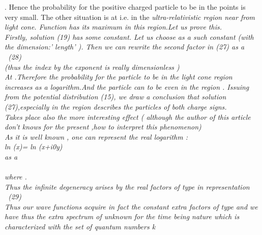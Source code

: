 \documentclass[a4paper,12pt] {article}
\begin{document}
{ \coordHE{}. Hence the  probability for the positive charged  particle to be in the points
 \coordHE{} is very small. The other situation is at \coordHE{} i.e. in the  \it ultra-relativistic region \rm
  near from light cone. Function  \coordHE{}  has its maximum in this region.Let us prove this.
\\ Firstly, solution  (19) has some constant. Let us choose as a such constant \coordHE{}
 (with the dimension:' length' \coordHE{} ). Then we can rewrite the second factor in  (27) as a \\\coordHE{}
\ (28)
\\(thus \it the index by the exponent is really dimensionless \rm )
\\  At \coordHE{}.Therefore the  probability for the particle to be in the light cone region
 increases as a \it logarithm.\rm And the particle can to be even in the region \coordHE{}. Issuing from
 the potential distribution (15), we draw a conclusion that
\it  solution \rm (27),\it  especially in the region \coordHE{} \it  describes the particles of both charge signs.
\\ \rm Takes place also the more interesting effect ( although the author of this article don't   knows for
the present ,how to interpret this phenomenon)
\\As it is well known , one can represent the real  logarithm :\\ \rm ln (x)= \rm ln (x+i0y) \\ as a \\ \coordHE{}
\\
 where \coordHE{}.\\ \rm Thus \it the infinite degeneracy \rm arises  by the real factors of \coordHE{} type
 in representation  \\\coordHE{} \ (29)
\\ Thus \it our wave functions acquire in fact the constant extra factors of  \coordHE{} \it type \rm and
we have thus \it the extra spectrum \rm of unknown for the time being nature which is \it  characterized
with the set of quantum numbers \rm k
}
\end{document}
